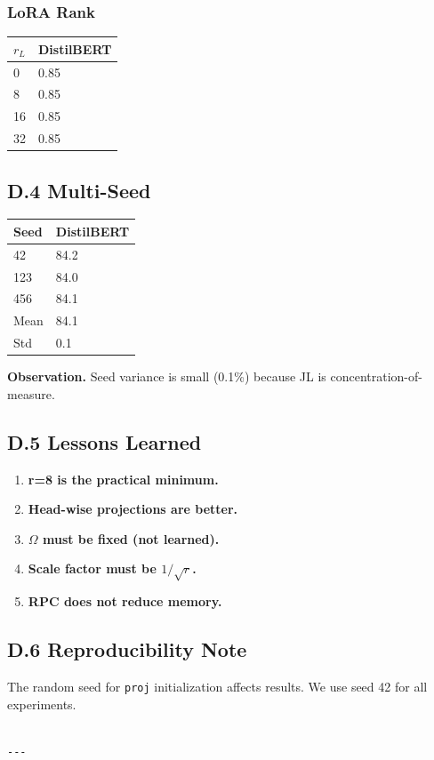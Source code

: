 \subsubsection{LoRA Rank}

\begin{table}[H]
\centering
\small
\begin{tabular}{ll}
\toprule
\textbf{$r_L$} & \textbf{DistilBERT} \\
\midrule
0 & 0.85 \\
8 & 0.85 \\
16 & 0.85 \\
32 & 0.85 \\
\bottomrule
\end{tabular}
\end{table}

\subsection{D.4 Multi-Seed}

\begin{table}[H]
\centering
\small
\begin{tabular}{ll}
\toprule
\textbf{Seed} & \textbf{DistilBERT} \\
\midrule
42 & 84.2 \\
123 & 84.0 \\
456 & 84.1 \\
Mean & 84.1 \\
Std & 0.1 \\
\bottomrule
\end{tabular}
\end{table}

\textbf{Observation.} Seed variance is small (0.1\%) because JL is 
concentration-of-measure.

\subsection{D.5 Lessons Learned}

\begin{enumerate}
\item \textbf{r=8 is the practical minimum.}
\item \textbf{Head-wise projections are better.}
\item \textbf{$\Omega$ must be fixed (not learned).}
\item \textbf{Scale factor must be $1/\sqrt{r}$.}
\item \textbf{RPC does not reduce memory.}

\end{enumerate}
\subsection{D.6 Reproducibility Note}

The random seed for \texttt{proj} initialization affects results. We use seed 
42 for all experiments.
\begin{lstlisting}

---
\end{lstlisting}
